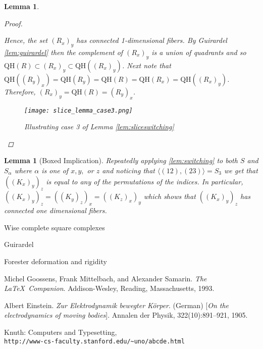 \documentclass{article}
\newcommand{\sxyz}{((K_x)_y)_z}
\newcommand{\rxy}{(R_x)_y}
\newcommand{\ryx}{(R_y)_x}
\newcommand{\Sxyz}[3]{((K_#1)_#2)_#3}
\theoremstyle{mystyle}
\newtheorem{lem}[thm]{Lemma}
\theoremstyle{remark}
\begin{document}
\begin{lem}
\begin{proof}
\begin{enumerate}
        \end{enumerate}
        Hence, the set $\rxy$ has connected 1-dimensional fibers. By Guirardel \ref{lem:guirardel} then the complement of $\rxy$ is a union of quadrants and so $\text{QH}(R)\subset \rxy\subset \text{QH}(\rxy)$. Next note that $\text{QH}((R_y)_x)=\text{QH}(R_y)=\text{QH}(R)=\text{QH}(R_x)=\text{QH}((R_x)_y)$. Therefore, $\rxy =\text{QH}(R)=\ryx$.
        
        
        
        \begin{figure}[htp]
    \centering
    \texttt{[image: slice\_lemma\_case3.png]}
    \caption{Illustrating case 3 of Lemma \ref{lem:sliceswitching}}
    \label{fig:square}
\end{figure}
        
        
        
                  
    \end{proof}
\end{lem}
    
        \begin{lem}
    [Boxed Implication]
 \label{lem:boximp} 
    Repeatedly applying \ref{lem:switching} to both \(S\) and \(S_{\alpha}\) where \(\alpha\) is one of \(x,y,\) or \(z\)  and noticing that \(\langle (12),(23) \rangle = S_{3}\) we get that \(\sxyz\) is equal to any of the permutations of the indices. In particular, \(\Sxyz{x}{y}{z}=\Sxyz{y}{z}{x}=\Sxyz{z}{x}{y}\) which shows that \(\sxyz\) has connected one dimensional fibers.
\end{lem}


\begin{thebibliography}{9}

Wise complete square complexes

Guirardel

Forester deformation and rigidity


Michel Goossens, Frank Mittelbach, and Alexander Samarin. 
\textit{The \LaTeX\ Companion}. 
Addison-Wesley, Reading, Massachusetts, 1993.

Albert Einstein. 
\textit{Zur Elektrodynamik bewegter K{\"o}rper}. (German) 
[\textit{On the electrodynamics of moving bodies}]. 
Annalen der Physik, 322(10):891–921, 1905.

Knuth: Computers and Typesetting,
\\\texttt{http://www-cs-faculty.stanford.edu/\~{}uno/abcde.html}
\end{thebibliography}
\end{document}

